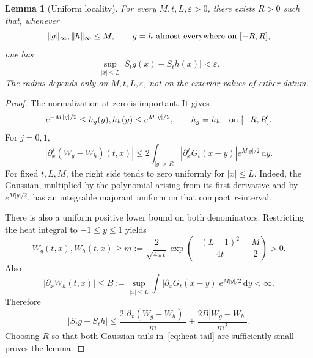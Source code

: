 \documentclass[11pt,a4paper]{article}
\numberwithin{equation}{section}
\newtheorem{lemma}[theorem]{Lemma}
\theoremstyle{remark}\newtheorem{remark}[theorem]{Remark}
\newcommand{\dd}{\,\mathrm d}
\begin{document}
\begin{lemma}[Uniform locality]\label{lem:locality}
For every $M,t,L,\varepsilon>0$, there exists $R>0$ such that, whenever
\[
 \|g\|_\infty,\|h\|_\infty\leq M,
 \qquad g=h\ \hbox{almost everywhere on }[-R,R],
\]
one has
\[
 \sup_{|x|\leq L}|S_tg(x)-S_th(x)|<\varepsilon.
\]
The radius depends only on $M,t,L,\varepsilon$, not on the exterior values of either datum.
\end{lemma}
\begin{proof}
The normalization at zero is important. It gives
\[
 e^{-M|y|/2}\leq h_g(y),h_h(y)\leq e^{M|y|/2},
 \qquad h_g=h_h\quad\hbox{on }[-R,R].
\]
For $j=0,1$,
\begin{equation}\label{eq:heat-tail}
 |\partial_x^j(W_g-W_h)(t,x)|
 \leq 2\int_{|y|>R}|\partial_x^jG_t(x-y)|e^{M|y|/2}\dd y.
\end{equation}
For fixed $t,L,M$, the right side tends to zero uniformly for $|x|\leq L$. Indeed, the Gaussian, multiplied by the polynomial arising from its first derivative and by $e^{M|y|/2}$, has an integrable majorant uniform on that compact $x$-interval.

There is also a uniform positive lower bound on both denominators. Restricting the heat integral to $-1\leq y\leq1$ yields
\begin{equation}\label{eq:denom}
 W_g(t,x),W_h(t,x)\geq
 m:=\frac{2}{\sqrt{4\pi t}}
 \exp\left(-\frac{(L+1)^2}{4t}-\frac M2\right)>0.
\end{equation}
Also
\[
 |\partial_xW_h(t,x)|\leq
 B:=\sup_{|x|\leq L}\int|\partial_xG_t(x-y)|e^{M|y|/2}\dd y<\infty.
\]
Therefore
\[
 |S_tg-S_th|
 \leq \frac{2|\partial_x(W_g-W_h)|}{m}
      +\frac{2B|W_g-W_h|}{m^2}.
\]
Choosing $R$ so that both Gaussian tails in~\eqref{eq:heat-tail} are sufficiently small proves the lemma.
\end{proof}
\end{document}
